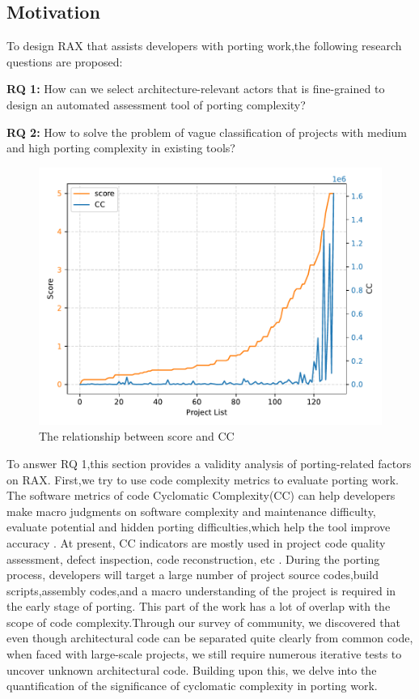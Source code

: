 \documentclass[sigconf,screen,review,anonymous]{acmart}
\begin{document}
\subsection{Motivation}
To design RAX that assists developers with porting work,the following research questions are proposed:

\textbf{RQ 1:} How can we select architecture-relevant actors that is fine-grained to design an automated assessment tool of porting complexity?

\textbf{RQ 2:} How to solve the problem of vague classification of projects with medium and high porting complexity in existing tools?
\begin{figure}
  \centering
  \includegraphics[width=\linewidth]{figure2.pdf}
  \caption{The relationship between score and CC}
  \label{fig:figure2}
\end{figure}
 
To answer RQ 1,this section provides a validity analysis of porting-related factors on RAX.
First,we try to use code complexity metrics to evaluate porting work.
The software metrics of code Cyclomatic Complexity(CC) can help developers make macro judgments on software complexity and maintenance difficulty, evaluate potential and hidden porting difficulties,which help the tool improve accuracy \cite{2005Exploring}.
At present, CC indicators are mostly used in project code quality assessment, defect inspection, code reconstruction, etc \cite{1991Cyclomatic}.
During the porting process, developers will target a large number of project source codes,build scripts,assembly codes,and a macro understanding of the project is required in the early stage of porting.
This part of the work has a lot of overlap with the scope of code complexity.Through our survey of community, we discovered that even though architectural code can be separated quite clearly from common code, when faced with large-scale projects, we still require numerous iterative tests to uncover unknown architectural code. Building upon this, we delve into the quantification of the significance of cyclomatic complexity in porting work.
\end{document}
